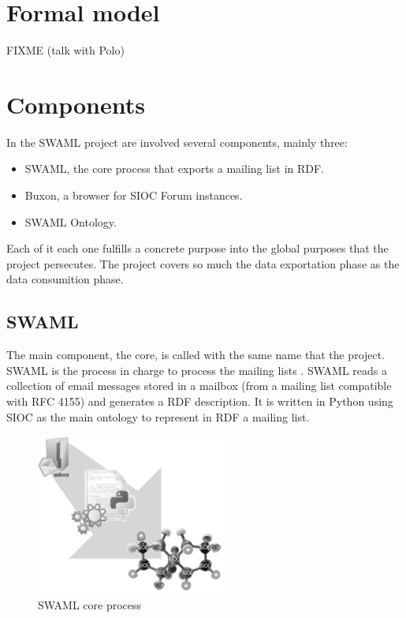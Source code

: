 \documentclass{llncs}
\begin{document}
\section{Formal model}

FIXME (talk with Polo)

\section{Components}

In the SWAML project are involved several components, mainly three:

\begin{itemize}
 \item SWAML, the core process that exports a mailing list in RDF.
 \item Buxon, a browser for SIOC Forum instances.
 \item SWAML Ontology.
\end{itemize}

Each of it each one fulfills a concrete purpose into the global purposes that 
the project persecutes. The project covers so much the data exportation phase 
as the data consumition phase.

\subsection{SWAML}

The main component, the core, is called with the same name that the project. SWAML is
the process in charge to process the mailing lists . SWAML reads a collection of email 
messages stored in a mailbox (from a mailing list compatible with RFC 4155) and generates 
a RDF description. It is written in Python using SIOC as the main ontology to represent 
in RDF a mailing list.

\begin{figure}[ht]
 \centering
 \includegraphics[bb=0 0 238 200]{images/swaml-process.png}
 \caption{SWAML core process}
\end{figure}
\end{document}
